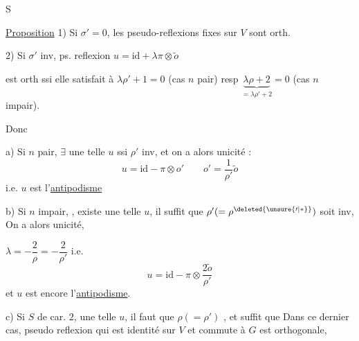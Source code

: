  S

\uline{Proposition} 1) Si $\sigma'=0$,  les   pseudo-reflexions   fixes sur $V$ sont orth.

2) Si $\sigma'$ inv,  ps. reflexion $u=\mathrm{id}+\lambda\pi\otimes\widetilde o$

est orth ssi elle satisfait à $\lambda\rho'+1=0$ (cas $n$ pair) resp $\underbrace{\lambda\rho+2}_{=\lambda\rho'+2}=0$ (cas $n$ impair).

Donc

a) Si $n$ pair, $\exists$ une telle $u$  ssi $\rho'$ inv, et on a alors unicité :
\[
u=\mathrm{id}-\pi\otimes o'\qquad o'=\frac1{\rho'}\widetilde o\tag*{(6)}
\]
i.e. $u$ est l'\uline{antipodisme}

b) Si $n$ impair, ,     existe une telle $u$, il   suffit que $\rho' (=\rho^{\deleted{\unsure{\prime|*}}})$ soit inv,     On a alors unicité,


$\lambda=-\dfrac2\rho=-\dfrac2{\rho'}$ i.e.
\[
u=\mathrm{id}-\pi\otimes\frac{2\widetilde o}{\rho'}\tag*{(7)}
\]
et $u$ est encore l'\uline{antipodisme}.

c) Si  $S$ de car. $2$,    une telle $u$, il  faut que $\rho(=\rho')$  , et suffit que   Dans ce dernier cas,  pseudo reflexion qui est identité sur $V$ et commute à $G$ est orthogonale,



